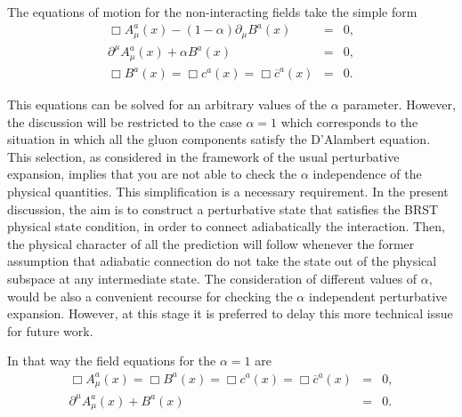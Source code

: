 \documentclass[12pt,letterpaper]{report}
\begin{document}
The equations of motion for the non-interacting fields take the
simple form
\begin{eqnarray}
\Box A_\mu ^a\left(x\right) -\left(1-\alpha \right) \partial _\mu
B^a\left(x\right) &=&0, \\ \partial ^\mu A_\mu ^a\left(x\right)
+\alpha B^a\left(x\right) &=&0, \label{liga1} \\ \Box B^a\left(
x\right) =\Box c^a\left(x\right) =\Box \overline{c} ^a\left(
x\right) &=&0.
\end{eqnarray}

This equations can be solved for an arbitrary values of the
$\alpha$ parameter. However, the discussion will be restricted to
the case $\alpha =1$ which corresponds to the situation in which
all the gluon components satisfy the D'Alambert equation. This
selection, as considered in the framework of the usual
perturbative expansion, implies that you are not able to check the
$\alpha$ independence of the physical quantities. This
simplification is a necessary requirement. In the present
discussion, the aim is to construct a perturbative state that
satisfies the BRST physical state condition, in order to connect
adiabatically the interaction. Then, the physical character of all
the prediction will follow whenever the former assumption that
adiabatic connection do not take the state out of the physical
subspace at any intermediate state. The consideration of different
values of $\alpha $, would be also a convenient recourse for
checking the $\alpha$ independent perturbative expansion. However,
at this stage it is preferred to delay this more technical issue
for future work.

In that way the field equations for the $\alpha =1$ are
\begin{eqnarray}
\Box A_\mu ^a\left(x\right)=\Box B^a\left(x\right) =\Box c^a\left(
x\right) =\Box \overline{c} ^a\left(x\right) &=&0, \label{movi1}
\\
\partial ^\mu A_\mu ^a\left(x\right) +B^a\left(x\right) &=&0.
\label{movi2}
\end{eqnarray}
\end{document}

